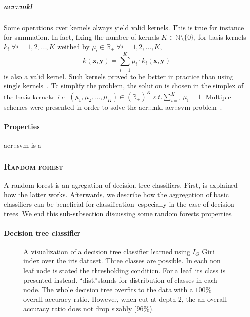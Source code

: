                 \subparagraph{\acrlong*{acr::mkl}}
                    Some operations over kernels always yield valid kernels.
                    This is true for instance for summation.
                    In fact, fixing the number of kernels $K\in \mathbb{N} \setminus \{0\}$, for basis kernels $k_i \; \forall i=1,2,\dots,K$ weithed by $\mu_i \in \mathbb{R}_+\; \forall i=1,2,\dots,K$,
                    \begin{equation*}
                        k(\bm{x}, \bm{y}) = \sum_{i=1}^K \mu_i \cdot k_i(\bm{x}, \bm{y})
                    \end{equation*}
                    is also a valid kernel.
                    Such kernels proved to be better in practice than using single kernels~\parencite{lanckriet2004statistical}.
                    To simplify the problem, the solution is chosen in the simplex of the basis kernels: \textit{i.e.} $ (\mu_1, \mu_2, \dots, \mu_K) \in (\mathbb{R}_+)^K  \; s.t. \sum_{i=1}^K \mu_i = 1$.
                    Multiple schemes were presented in order to solve the \gls{acr::mkl} \gls{acr::svm} problem~\parencite{rakotomamonjy2008simplemkl, sun2010multiple, varma2009more}.
                    
            \paragraph{Properties}
                \gls{acr::svm} is a
        \subsubsection{\textsc{Random forest}}
            A random forest is an agregation of decision tree classifiers.
            First, is explained how the latter works.
            Afterwards, we describe how the aggregation of basic classifiers can be beneficial for classification, especially in the case of decision trees.
            We end this sub-subsection discussing some random forests properties.

            \paragraph{Decision tree classifier}
                \begin{figure}
                    \centering
                    
                    \caption{
                        \label{fig::decision_tree_graph} A visualization of a decision tree classifier learned using $I_G$ Gini index over the iris dataset.
                        Three classes are possible.
                        In each non leaf node is stated the thresholding condition.
                        For a leaf, its class is presented instead.
                        ``dist.''stands for distribution of classes in each node.
                        The whole decision tree overfits to the data with a $100\%$ overall accuracy ratio.
                        However, when cut at depth 2, the an overall accuracy ratio does not drop sizably ($96\%$).
                    }
                \end{figure}

